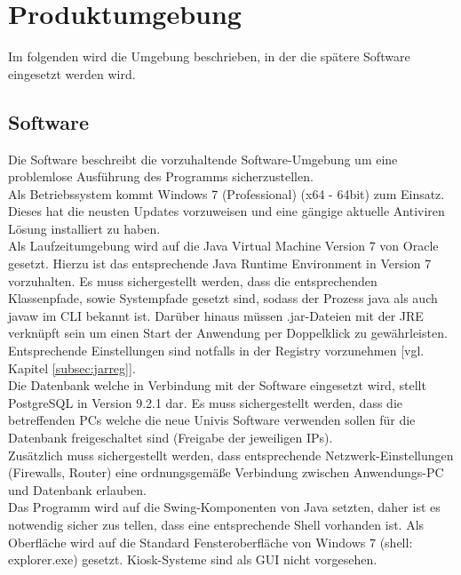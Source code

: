 \section{Produktumgebung}
\label{sec:Produktumgebung}

Im folgenden wird die Umgebung beschrieben, in der die spätere Software eingesetzt werden wird.

\subsection{Software}
\label{subsec:software}

Die Software beschreibt die vorzuhaltende Software-Umgebung um eine problemlose Ausführung des Programms sicherzustellen.\\


Als Betriebssystem kommt Windows 7 (Professional) (x64 - 64bit) zum Einsatz. Dieses hat die neusten Updates vorzuweisen und eine gängige aktuelle Antiviren Lösung installiert zu haben.\\

Als Laufzeitumgebung wird auf die Java Virtual Machine Version 7 von Oracle gesetzt.
Hierzu ist das entsprechende Java Runtime Environment in Version 7 vorzuhalten. Es muss sichergestellt werden, dass die entsprechenden Klassenpfade, sowie Systempfade gesetzt sind, sodass der Prozess java als auch javaw im CLI bekannt ist. Darüber hinaus müssen .jar-Dateien mit der JRE verknüpft sein um einen Start der Anwendung per Doppelklick zu gewährleisten. Entsprechende Einstellungen sind notfalls in der Registry vorzunehmen [vgl. Kapitel \ref{subsec:jarreg}].\\

Die Datenbank welche in Verbindung mit der Software eingesetzt wird, stellt PostgreSQL in Version 9.2.1 dar.
Es muss sichergestellt werden, dass die betreffenden PCs welche die neue Univis Software verwenden sollen für die Datenbank freigeschaltet sind (Freigabe der jeweiligen IPs).\\

Zusätzlich muss sichergestellt werden, dass entsprechende Netzwerk-Einstellungen (Firewalls, Router) eine ordnungsgemäße Verbindung zwischen Anwendungs-PC und Datenbank erlauben.\\

Das Programm wird auf die Swing-Komponenten von Java setzten, daher ist es notwendig sicher zus tellen, dass eine entsprechende Shell vorhanden ist.
Als Oberfläche wird auf die Standard Fensteroberfläche von Windows 7 (shell: explorer.exe) gesetzt. Kiosk-Systeme sind als GUI nicht vorgesehen. \\


